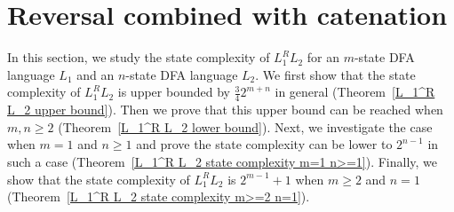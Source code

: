 \documentclass[10pt]{article}
\begin{document}
\section{Reversal combined with catenation}\label{sec:rev-cat}
In this section, we study the state complexity of $L_1^R L_2$ for an
$m$-state DFA language $L_1$ and an $n$-state DFA language $L_2$. We
first show that the state complexity of $L_1^R L_2$ is upper bounded
by $\frac{3}{4}2^{m+n}$ in general (Theorem~\ref{L_1^R L_2 upper
bound}). Then we prove that this upper bound can be reached when
$m,n \ge 2$ (Theorem~\ref{L_1^R L_2 lower bound}). Next, we
investigate the case when $m=1$ and $n\ge 1$ and prove the state
complexity can be lower to $2^{n-1}$ in such a case
(Theorem~\ref{L_1^R L_2 state complexity m=1 n>=1}). Finally, we
show that the state complexity of $L_1^R L_2$ is $2^{m-1}+1$ when $m
\ge 2$ and $n=1$ (Theorem~\ref{L_1^R L_2 state complexity m>=2
n=1}).
\end{document}
